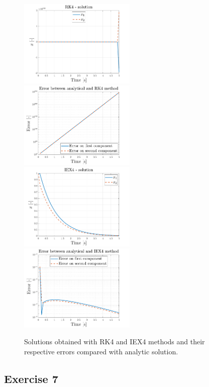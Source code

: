 \documentclass[11pt,a4paper,oneside]{article}
\begin{document}
\begin{figure}[h]
    \centering
    \includegraphics[width=0.495\textwidth]{gfx/ex6_2.pdf}
    \includegraphics[width=0.495\textwidth]{gfx/ex6_3.pdf}
    \includegraphics[width=0.495\textwidth]{gfx/ex6_4.pdf}
    \includegraphics[width=0.495\textwidth]{gfx/ex6_5.pdf}
    \caption{Solutions obtained with RK4 and IEX4 methods and their respective errors 
    compared with analytic solution.}\label{fig:ex6_1}
\end{figure}
\clearpage
\subsection*{Exercise 7}
\end{document}
